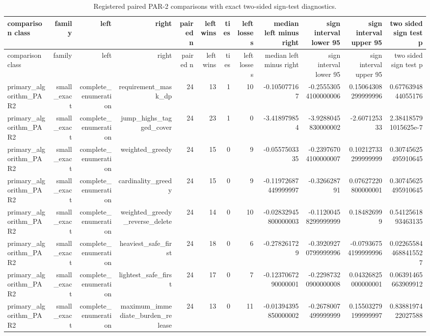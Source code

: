 {\footnotesize
\begin{longtable}{lrrrrrrrrrrr}
\caption{Registered paired PAR-2 comparisons with exact two-sided sign-test diagnostics.}\label{tab:aor-paired-comparisons}\\
\toprule
comparison class & family & left & right & paired n & left wins & ties & left losses & median left minus right & sign interval lower 95 & sign interval upper 95 & two sided sign test p \\
\midrule
\endfirsthead
\toprule
comparison class & family & left & right & paired n & left wins & ties & left losses & median left minus right & sign interval lower 95 & sign interval upper 95 & two sided sign test p \\
\midrule
\endhead
primary\_algorithm\_PAR2 & small\_exact & complete\_enumeration & requirement\_mask\_dp & 24 & 13 & 1 & 10 & -0.105077167 & -0.25553054100000006 & 0.15064308299999996 & 0.6776394844055176 \\
primary\_algorithm\_PAR2 & small\_exact & complete\_enumeration & jump\_highs\_tagged\_cover & 24 & 23 & 1 & 0 & -3.418979854 & -3.9288045830000002 & -2.607125333 & 2.384185791015625e-7 \\
primary\_algorithm\_PAR2 & small\_exact & complete\_enumeration & weighted\_greedy & 24 & 15 & 0 & 9 & -0.0557503335 & -0.23976704100000007 & 0.10212733299999999 & 0.30745625495910645 \\
primary\_algorithm\_PAR2 & small\_exact & complete\_enumeration & cardinality\_greedy & 24 & 15 & 0 & 9 & -0.11972687449999997 & -0.326628791 & 0.07627220800000001 & 0.30745625495910645 \\
primary\_algorithm\_PAR2 & small\_exact & complete\_enumeration & weighted\_greedy\_reverse\_delete & 24 & 14 & 0 & 10 & -0.02832945800000003 & -0.11200458299999999 & 0.184826999 & 0.5412561893463135 \\
primary\_algorithm\_PAR2 & small\_exact & complete\_enumeration & heaviest\_safe\_first & 24 & 18 & 0 & 6 & -0.278261729 & -0.39209270799999996 & -0.07936754199999996 & 0.022655844688415527 \\
primary\_algorithm\_PAR2 & small\_exact & complete\_enumeration & lightest\_safe\_first & 24 & 17 & 0 & 7 & -0.1237067290000001 & -0.22987320900000008 & 0.04326825000000001 & 0.06391465663909912 \\
primary\_algorithm\_PAR2 & small\_exact & complete\_enumeration & maximum\_immediate\_burden\_release & 24 & 13 & 0 & 11 & -0.01394395850000002 & -0.2678007499999999 & 0.15503279199999997 & 0.8388197422027588 \\

\end{longtable}}
